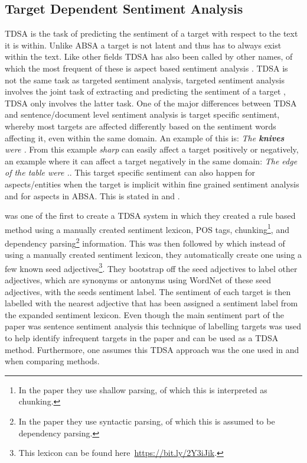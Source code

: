 \subsection{Target Dependent Sentiment Analysis}

TDSA is the task of predicting the sentiment of a target with respect to the text it is within. Unlike ABSA a target is not latent and thus has to always exist within the text. Like other fields TDSA has also been called by other names, of which the most frequent of these is aspect based sentiment analysis \citep{wang-etal-2016-attention}. TDSA is not the same task as targeted sentiment analysis, targeted sentiment analysis involves the joint task of extracting and predicting the sentiment of a target \citep{mitchell-etal-2013-open}, TDSA only involves the latter task. One of the major differences between TDSA and sentence/document level sentiment analysis is target specific sentiment, whereby most targets are affected differently based on the sentiment words affecting it, even within the same domain. An example of this is: \textit{The \textbf{knives} were .} From this example \textit{sharp} can easily affect a target positively or negatively, an example where it can affect a target negatively in the same domain: \textit{The edge of the table were .}. This target specific sentiment can also happen for aspects/entities when the target is implicit within fine grained sentiment analysis and for aspects in ABSA. This is stated in \citet[\S2]{ding2008holistic} and \citet[\S3.3.4]{popescu-etzioni-2005-extracting}.

\citet{nasukawa2003sentiment} was one of the first to create a TDSA system in which they created a rule based method using a manually created sentiment lexicon, POS tags, chunking\footnote{In the paper they use shallow parsing, of which this is interpreted as chunking.}, and dependency parsing\footnote{In the paper they use syntactic parsing, of which this is assumed to be dependency parsing.} information. This was then followed by \citep{hu2004mining} which instead of using a manually created sentiment lexicon, they automatically create one using a few known seed adjectives\footnote{This lexicon can be found here~\url{https://bit.ly/2Y3iJik}.}.  They bootstrap off the seed adjectives to label other adjectives, which are synonyms or antonyms using WordNet \citep{miller1995wordnet} of these seed adjectives, with the seeds sentiment label. The sentiment of each target is then labelled with the nearest adjective that has been assigned a sentiment label from the expanded sentiment lexicon. Even though the main sentiment part of the paper was sentence sentiment analysis this technique of labelling targets was used to help identify infrequent targets in the paper and can be used as a TDSA method. Furthermore, one assumes this TDSA approach was the one used in \citet{popescu-etzioni-2005-extracting} and \citet{ding2008holistic} when comparing methods.

